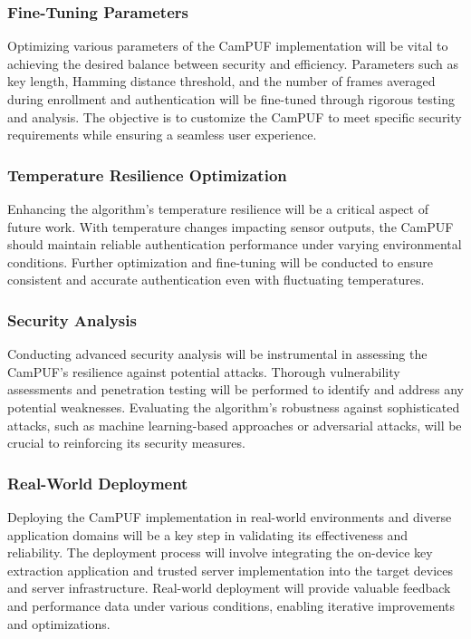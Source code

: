 \subsubsection{Fine-Tuning Parameters}

Optimizing various parameters of the CamPUF implementation will be vital to achieving the desired balance between security and efficiency. Parameters such as key length, Hamming distance threshold, and the number of frames averaged during enrollment and authentication will be fine-tuned through rigorous testing and analysis. The objective is to customize the CamPUF to meet specific security requirements while ensuring a seamless user experience.

\subsubsection{Temperature Resilience Optimization}

Enhancing the algorithm's temperature resilience will be a critical aspect of future work. With temperature changes impacting sensor outputs, the CamPUF should maintain reliable authentication performance under varying environmental conditions. Further optimization and fine-tuning will be conducted to ensure consistent and accurate authentication even with fluctuating temperatures.

\subsubsection{Security Analysis}

Conducting advanced security analysis will be instrumental in assessing the CamPUF's resilience against potential attacks. Thorough vulnerability assessments and penetration testing will be performed to identify and address any potential weaknesses. Evaluating the algorithm's robustness against sophisticated attacks, such as machine learning-based approaches or adversarial attacks, will be crucial to reinforcing its security measures.

\subsubsection{Real-World Deployment}

Deploying the CamPUF implementation in real-world environments and diverse application domains will be a key step in validating its effectiveness and reliability. The deployment process will involve integrating the on-device key extraction application and trusted server implementation into the target devices and server infrastructure. Real-world deployment will provide valuable feedback and performance data under various conditions, enabling iterative improvements and optimizations.

